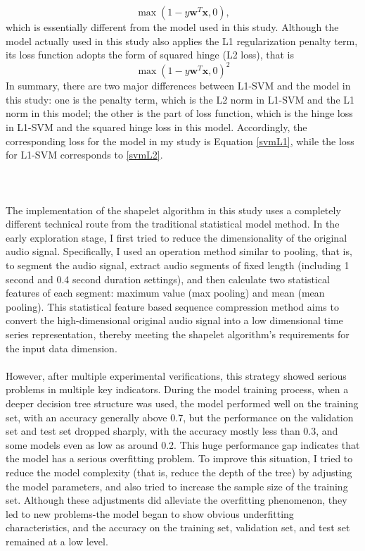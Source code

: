 $$
\max(1-y\mathbf{w}^T\mathbf{x},0),
$$
which is essentially different from the model used in this study. Although the model actually used in this study also applies the L1 regularization penalty term, its loss function adopts the form of squared hinge (L2 loss), that is
$$
\max(1-y\mathbf{w}^T\mathbf{x},0)^2
$$
In summary, there are two major differences between L1-SVM and the model in this study: one is the penalty term, which is the L2 norm in L1-SVM and the L1 norm in this model; the other is the part of loss function, which is the hinge loss in L1-SVM and the squared hinge loss in this model. Accordingly, the corresponding loss for the model in my study is Equation \eqref{svmL1}, while the loss for L1-SVM corresponds to \eqref{svmL2}.\\
\\
\\
\\
The implementation of the shapelet algorithm in this study uses a completely different technical route from the traditional statistical model method. In the early exploration stage, I first tried to reduce the dimensionality of the original audio signal. Specifically, I used an operation method similar to pooling, that is, to segment the audio signal, extract audio segments of fixed length (including 1 second and 0.4 second duration settings), and then calculate two statistical features of each segment: maximum value (max pooling) and mean (mean pooling). This statistical feature based sequence compression method aims to convert the high-dimensional original audio signal into a low dimensional time series representation, thereby meeting the shapelet algorithm's requirements for the input data dimension.\\
\\
However, after multiple experimental verifications, this strategy showed serious problems in multiple key indicators. During the model training process, when a deeper decision tree structure was used, the model performed well on the training set, with an accuracy generally above 0.7, but the performance on the validation set and test set dropped sharply, with the accuracy mostly less than 0.3, and some models even as low as around 0.2. This huge performance gap indicates that the model has a serious overfitting problem. To improve this situation, I tried to reduce the model complexity (that is, reduce the depth of the tree) by adjusting the model parameters, and also tried to increase the sample size of the training set. Although these adjustments did alleviate the overfitting phenomenon, they led to new problems-the model began to show obvious underfitting characteristics, and the accuracy on the training set, validation set, and test set remained at a low level.\\
